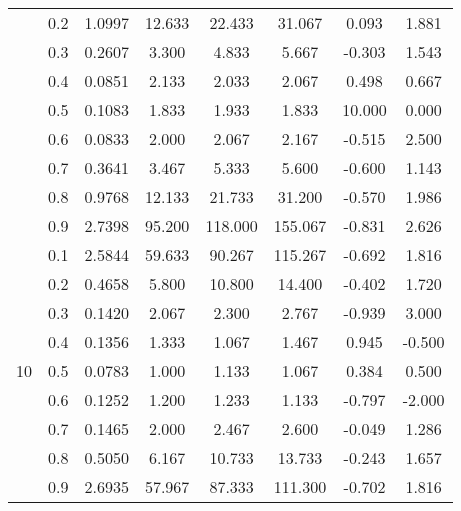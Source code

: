 \documentclass[11pt,a4paper]{report}
\begin{document}
\begin{longtable}{ | c | c || c | c | c | c | c | c | }
 & 0.2 & 1.0997 & 12.633 & 22.433 & 31.067 & 0.093 & 1.881 \\
 & 0.3 & 0.2607 & 3.300 & 4.833 & 5.667 & -0.303 & 1.543 \\
 & 0.4 & 0.0851 & 2.133 & 2.033 & 2.067 & 0.498 & 0.667 \\
 & 0.5 & 0.1083 & 1.833 & 1.933 & 1.833 & 10.000 & 0.000 \\
 & 0.6 & 0.0833 & 2.000 & 2.067 & 2.167 & -0.515 & 2.500 \\
 & 0.7 & 0.3641 & 3.467 & 5.333 & 5.600 & -0.600 & 1.143 \\
 & 0.8 & 0.9768 & 12.133 & 21.733 & 31.200 & -0.570 & 1.986 \\
 & 0.9 & 2.7398 & 95.200 & 118.000 & 155.067 & -0.831 & 2.626 \\
 \hline
\multirow{9}{*}{10} & 0.1 & 2.5844 & 59.633 & 90.267 & 115.267 & -0.692 & 1.816 \\
 & 0.2 & 0.4658 & 5.800 & 10.800 & 14.400 & -0.402 & 1.720 \\
 & 0.3 & 0.1420 & 2.067 & 2.300 & 2.767 & -0.939 & 3.000 \\
 & 0.4 & 0.1356 & 1.333 & 1.067 & 1.467 & 0.945 & -0.500 \\
 & 0.5 & 0.0783 & 1.000 & 1.133 & 1.067 & 0.384 & 0.500 \\
 & 0.6 & 0.1252 & 1.200 & 1.233 & 1.133 & -0.797 & -2.000 \\
 & 0.7 & 0.1465 & 2.000 & 2.467 & 2.600 & -0.049 & 1.286 \\
 & 0.8 & 0.5050 & 6.167 & 10.733 & 13.733 & -0.243 & 1.657 \\
 & 0.9 & 2.6935 & 57.967 & 87.333 & 111.300 & -0.702 & 1.816 \\
 \hline
\hline
\end{longtable}
\end{document}
